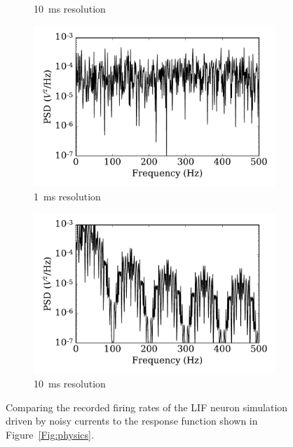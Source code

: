 \begin{figure}
\begin{subfigure}[t]{0.49\textwidth}
			\caption{10~ms resolution}
			\label{Fig:gaussian-10}
		\end{subfigure}
		\begin{subfigure}[t]{0.49\textwidth}
			\includegraphics[width=\textwidth]{pics_iconip/psd_dt1.pdf}
			\caption{1~ms resolution}
			\label{Fig:spectrum-1}
		\end{subfigure}
		\begin{subfigure}[t]{0.49\textwidth}
			\includegraphics[width=\textwidth]{pics_iconip/psd_dt10.pdf}
			\caption{10~ms resolution}
			\label{Fig:spectrum-10}
		\end{subfigure}
		\caption{Comparing the recorded firing rates of the LIF neuron simulation driven by noisy currents to the response function shown in Figure~\ref{Fig:physics}.}
		\label{Fig:lif_curr}
	\end{figure}
	
